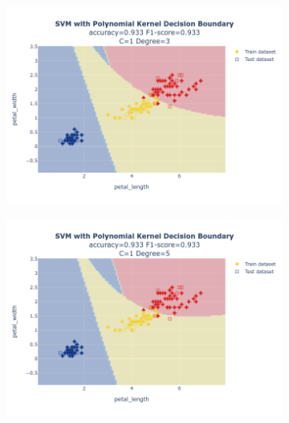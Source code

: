 \documentclass{article}
\begin{document}
\begin{figure}
\begin{subfigure}{0.3\textwidth}
        \includegraphics[scale=.13]{images/implementation/q1/polynomial_kernel/petal_length_petal_width_1_3.png}
    \end{subfigure}
    \hfill
    \begin{subfigure}{0.3\textwidth}
        \centering
        \includegraphics[scale=.13]{images/implementation/q1/polynomial_kernel/petal_length_petal_width_1_5.png}
    \end{subfigure}
    \hfill
    \begin{subfigure}{0.3\textwidth}
        \centering

\end{subfigure}
\end{figure}
\end{document}
